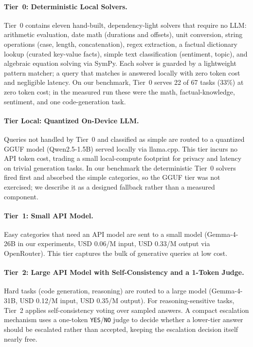 \documentclass[11pt]{article}
\begin{document}
\paragraph{Tier~0: Deterministic Local Solvers.}
Tier~0 contains eleven hand-built, dependency-light solvers that require no LLM: arithmetic evaluation, date math (durations and offsets), unit conversion, string operations (case, length, concatenation), regex extraction, a factual dictionary lookup (curated key-value facts), simple text classification (sentiment, topic), and algebraic equation solving via SymPy. Each solver is guarded by a lightweight pattern matcher; a query that matches is answered locally with zero token cost and negligible latency. On our benchmark, Tier~0 serves 22 of 67 tasks (33\%) at zero token cost; in the measured run these were the math, factual-knowledge, sentiment, and one code-generation task.

\paragraph{Tier Local: Quantized On-Device LLM.}
Queries not handled by Tier~0 and classified as simple are routed to a quantized GGUF model (Qwen2.5-1.5B) served locally via llama.cpp. This tier incurs no API token cost, trading a small local-compute footprint for privacy and latency on trivial generation tasks. In our benchmark the deterministic Tier~0 solvers fired first and absorbed the simple categories, so the GGUF tier was not exercised; we describe it as a designed fallback rather than a measured component.

\paragraph{Tier~1: Small API Model.}
Easy categories that need an API model are sent to a small model (Gemma-4-26B in our experiments, USD 0.06/M input, USD 0.33/M output via OpenRouter). This tier captures the bulk of generative queries at low cost.

\paragraph{Tier~2: Large API Model with Self-Consistency and a 1-Token Judge.}
Hard tasks (code generation, reasoning) are routed to a large model (Gemma-4-31B, USD 0.12/M input, USD 0.35/M output). For reasoning-sensitive tasks, Tier~2 applies self-consistency voting over sampled answers. A compact escalation mechanism uses a one-token \texttt{YES}/\texttt{NO} judge to decide whether a lower-tier answer should be escalated rather than accepted, keeping the escalation decision itself nearly free.
\end{document}
